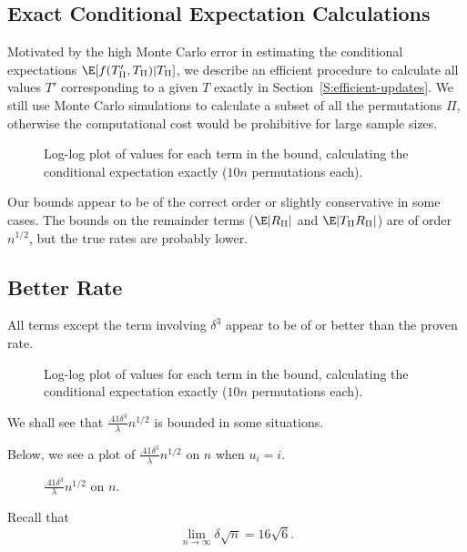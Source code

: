 \subsection{Exact Conditional Expectation Calculations}
Motivated by the high Monte Carlo error in estimating the conditional expectations
$\E[f(T'_{\Pi}, T_{\Pi}) | T_{\Pi}]$, we describe an efficient procedure to
calculate all values $T'$ corresponding to a given $T$ exactly in Section~\ref{S:efficient-updates}.
We still use Monte Carlo simulations to calculate a subset of all the permutations $\Pi$, otherwise
the computational cost would be prohibitive for large sample sizes.
\begin{figure}[!ht]
  \centering
  
  \caption{Log-log plot of values for each term in the bound, calculating the conditional
    expectation exactly ($10n$ permutations each).}
\end{figure}

Our bounds appear to be of the correct order or slightly conservative in some cases.  The bounds on
the remainder terms ($\E |R_{\Pi}|$ and $\E |T_{\Pi}R_{\Pi}|$) are of order $n^{1/2}$, but the true
rates are probably lower.
\clearpage

\subsection{Better Rate}
All terms except the term involving $\delta^3$ appear to be of or better than the proven rate.
\begin{figure}[!ht]
  \centering
  
  \caption{Log-log plot of values for each term in the bound, calculating the conditional
    expectation exactly ($10n$ permutations each).}
\end{figure}

We shall see that $\frac{.41 \delta^3}{\lambda}n^{1/2}$ is bounded in some situations.
\clearpage

Below, we see a plot of $\frac{.41 \delta^3}{\lambda}n^{1/2}$ on $n$
when $u_i = i$.
\begin{figure}[!ht]
  \centering
  
  \caption{$\frac{.41 \delta^3}{\lambda}n^{1/2}$ on $n$.}
\end{figure}

Recall that
\begin{equation*}
  \lim_{n \to \infty} \delta \sqrt{n} = 16 \sqrt{6}.
\end{equation*}


